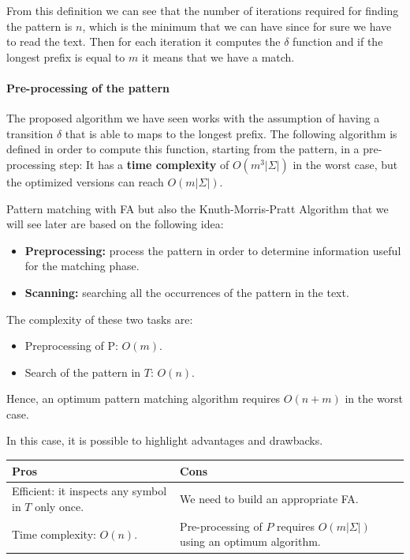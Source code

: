 
From this definition we can see that the number of iterations required for finding the pattern is $n$, which is the minimum that we can have since for sure we have to read the text. Then for each iteration it computes the $\delta$ function and if the longest prefix is equal to $m$ it means that we have a match.

\paragraph{Pre-processing of the pattern} The proposed algorithm we have seen works with the assumption of having a transition $\delta$ that is able to maps to the longest prefix. The following algorithm is defined in order to compute this function, starting from the pattern, in a pre-processing step:
It has a \textbf{time complexity} of $O(m^3|\Sigma|)$ in the worst case, but the optimized versions can reach $O(m|\Sigma|)$.

Pattern matching with FA but also the Knuth-Morris-Pratt Algorithm that we will see later are based on the following idea:
\begin{itemize}
	\item \textbf{Preprocessing:} process the pattern in order to determine information useful for the matching phase.
	\item \textbf{Scanning:} searching all the occurrences of  the pattern in the text. 
\end{itemize}
The complexity of these two tasks are:
\begin{itemize}
	\item Preprocessing of P: $O(m)$.
	\item Search of the pattern in $T$: $O(n)$.
\end{itemize}
Hence, an optimum pattern matching algorithm requires $O(n+m)$ in the worst case.

In this case, it is possible to highlight advantages and drawbacks.
\begin{table}[H]
	\centering
	\begin{tabular}{| p{7.5cm} | p{7.5cm} |}
		\hline
		\textbf{Pros} &  \textbf{Cons}\\
		\hline
		Efficient: it inspects any symbol in $T$ only once. & We need to build an appropriate FA.\\
		\hline
		Time complexity: $O(n)$. & Pre-processing of $P$ requires $O(m|\Sigma|)$ using an optimum algorithm.\\
		\hline
	\end{tabular}
\end{table} 

